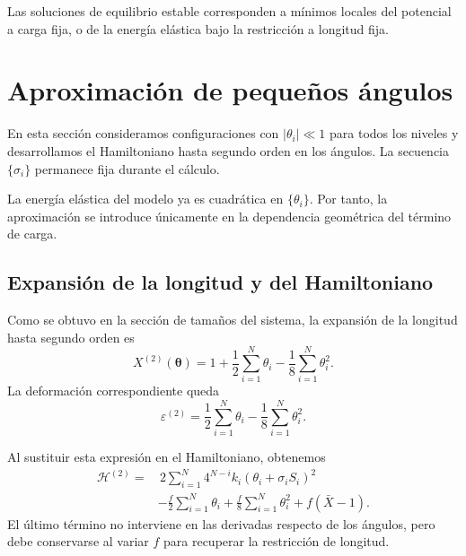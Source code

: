 \documentclass[11pt,a4paper]{article}
\begin{document}
Las soluciones de equilibrio estable corresponden a mínimos
locales del potencial a carga fija, o de la energía elástica
bajo la restricción a longitud fija.


\section{Aproximación de pequeños ángulos}
\label{sec:small}

En esta sección consideramos configuraciones con
$|\theta_i|\ll 1$ para todos los niveles y desarrollamos el
Hamiltoniano hasta segundo orden en los ángulos.
La secuencia $\{\sigma_i\}$ permanece fija durante el cálculo.

La energía elástica del modelo ya es cuadrática en
$\{\theta_i\}$. Por tanto, la aproximación se introduce
únicamente en la dependencia geométrica del término de carga.

\subsection{Expansión de la longitud y del Hamiltoniano}

Como se obtuvo en la sección de tamaños del sistema,
la expansión de la longitud hasta segundo orden es
\begin{equation}
X^{(2)}(\boldsymbol{\theta})
=
1+\frac12\sum_{i=1}^{N}\theta_i
-\frac18\sum_{i=1}^{N}\theta_i^2.
\label{eq:X_quadratic}
\end{equation}
La deformación correspondiente queda
\begin{equation}
\varepsilon^{(2)}
=
\frac12\sum_{i=1}^{N}\theta_i
-\frac18\sum_{i=1}^{N}\theta_i^2.
\label{eq:epsilon_quadratic}
\end{equation}

Al sustituir esta expresión en el Hamiltoniano, obtenemos
\begin{equation}
\begin{aligned}
\mathcal{H}^{(2)}
=
&\,2\sum_{i=1}^{N}4^{N-i}k_i
(\theta_i+\sigma_i S_i)^2
\\
&-\frac f2\sum_{i=1}^{N}\theta_i
+\frac f8\sum_{i=1}^{N}\theta_i^2
+f(\bar X-1).
\end{aligned}
\label{eq:H_quadratic_theta}
\end{equation}
El último término no interviene en las derivadas respecto
de los ángulos, pero debe conservarse al variar $f$ para
recuperar la restricción de longitud.
\end{document}
